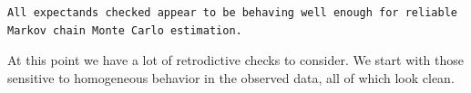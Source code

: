 \documentclass[
  letterpaper,
  DIV=11,
  numbers=noendperiod]{scrartcl}
\newenvironment{Shaded}{\begin{snugshade}}{\end{snugshade}}
\newcommand{\AttributeTok}[1]{\textcolor[rgb]{0.40,0.45,0.13}{#1}}
\newcommand{\ConstantTok}[1]{\textcolor[rgb]{0.56,0.35,0.01}{#1}}
\newcommand{\FunctionTok}[1]{\textcolor[rgb]{0.28,0.35,0.67}{#1}}
\newcommand{\NormalTok}[1]{\textcolor[rgb]{0.00,0.23,0.31}{#1}}
\newcommand{\OtherTok}[1]{\textcolor[rgb]{0.00,0.23,0.31}{#1}}
\newcommand{\SpecialCharTok}[1]{\textcolor[rgb]{0.37,0.37,0.37}{#1}}
\newcommand{\StringTok}[1]{\textcolor[rgb]{0.13,0.47,0.30}{#1}}
\begin{document}
\begin{Shaded}
\end{Shaded}

\begin{verbatim}
All expectands checked appear to be behaving well enough for reliable
Markov chain Monte Carlo estimation.
\end{verbatim}

At this point we have a lot of retrodictive checks to consider. We start
with those sensitive to homogeneous behavior in the observed data, all
of which look clean.
\end{document}
